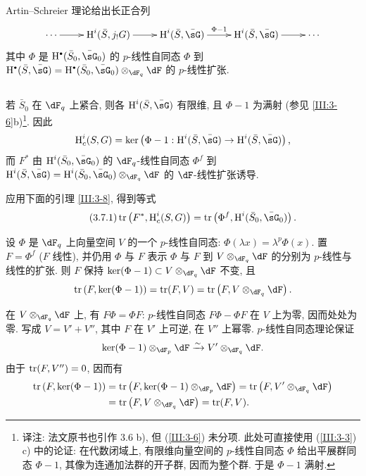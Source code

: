 Artin--Schreier 理论给出长正合列
\[\xymatrix{
  \cdots \ar[r]
    & \h^i(\bar S,j_! G) \ar[r]
    & \h^i(\bar S,\bar\sG) \ar[r]^-{\Phi-1}
    & \h^i(\bar S,\bar\sG) \ar[r]
    & \cdots
}\]
其中 $\Phi$ 是 $\h^\bullet(\bar S_0,\bar\sG_0)$ 的 $p$-线性自同态 $\Phi$ 到 $\h^\bullet(\bar S,\bar \sG)= \h^\bullet(\bar S_0,\bar\sG_0)\otimes_{\dF_q}\dF$ 的 $p$-线性扩张.

\subsection{}\label{III:3-7}

若 $\bar S_0$ 在 $\dF_q$ 上紧合, 则各 $\h^i(\bar S,\bar\sG)$ 有限维, 且 $\Phi-1$ 为满射 (参见 \ref{III:3-6}b)\footnote{译注: 法文原书也引作 3.6 b), 但 (\ref{III:3-6}) 未分项. 此处可直接使用 (\ref{III:3-3}) c) 中的论证: 在代数闭域上, 有限维向量空间的 $p$-线性自同态 $\Phi$ 给出平展群同态 $\Phi-1$, 其像为连通加法群的开子群, 因而为整个群. 于是 $\Phi-1$ 满射.}. 因此
\[
  \h_c^i(S,G) = \ker\left(\Phi-1 : \h^i(\bar S,\bar\sG) \to \h^i(\bar S,\bar\sG)\right) \text{,}
\]
而 $F^*$ 由 $\h^i(\bar S_0,\bar\sG_0)$ 的 $\dF_q$-线性自同态 $\Phi^f$ 到 $\h^i(\bar S,\bar\sG) = \h^i(\bar S_0,\bar\sG_0)\otimes_{\dF_q}\dF$ 的 $\dF$-线性扩张诱导.

应用下面的引理 \ref{III:3-8}, 得到等式
\begin{equation*}\tag{3.7.1}\label{III:eq:3-7-1}
  \tr\left(F^*,\h_c^i(S,G)\right) = \tr\left(\Phi^f,\h^i(\bar S_0,\bar\sG_0)\right) \text{.}
\end{equation*}

\begin{lemma_}\label{III:3-8}
设 $\Phi$ 是 $\dF_q$ 上向量空间 $V$ 的一个 $p$-线性自同态: $\Phi(\lambda x) = \lambda^p\Phi(x)$. 置 $F=\Phi^f$ ($F$ 线性), 并仍用 $\Phi$ 与 $F$ 表示 $\Phi$ 与 $F$ 到 $V\otimes_{\dF_q}\dF$ 的分别为 $p$-线性与线性的扩张. 则 $F$ 保持 $\ker(\Phi-1)\subset V\otimes_{\dF_q}\dF$ 不变, 且
\[
  \tr\left(F,\ker(\Phi-1)\right) = \tr(F,V) = \tr\left(F,V\otimes_{\dF_q}\dF\right) \text{.}
\]
\end{lemma_}

在 $V\otimes_{\dF_q}\dF$ 上, 有 $F\Phi = \Phi F$: $p$-线性自同态 $F\Phi-\Phi F$ 在 $V$ 上为零, 因而处处为零. 写成 $V=V'+V''$, 其中 $F$ 在 $V'$ 上可逆, 在 $V''$ 上幂零. $p$-线性自同态理论保证
\[
  \ker(\Phi-1)\otimes_{\dF_p}\dF \iso V'\otimes_{\dF_q}\dF \text{.}
\]
由于 $\operatorname{tr}(F,V'') = 0$, 因而有
\begin{align*}
  \tr\left(F,\ker(\Phi-1)\right)
    &= \tr\left(F,\ker(\Phi-1)\otimes_{\dF_p}\dF\right) = \tr\left(F,V'\otimes_{\dF_q}\dF\right) \\
    &= \tr\left(F,V\otimes_{\dF_q}\dF\right) = \tr(F,V) \text{.}
\end{align*}

